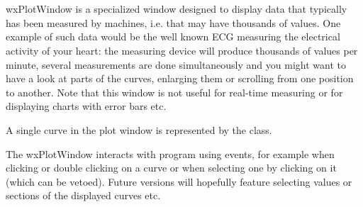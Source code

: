 %
%

\section{}\label{wxplotwindow}

wxPlotWindow is a specialized window designed to display data that typically has
been measured by machines, i.e. that may have thousands of values. One example of
such data would be the well known ECG measuring the electrical activity of your
heart: the measuring device will produce thousands of values per minute, several
measurements are done simultaneously and you might want to have a look at parts
of the curves, enlarging them or scrolling from one position to another. Note
that this window is not useful for real-time measuring or for displaying charts
with error bars etc.

A single curve in the plot window is represented by the  
class.

The wxPlotWindow interacts with program using events, for example when clicking
or double clicking on a curve or when selecting one by clicking on it (which
can be vetoed). Future versions will hopefully feature selecting values or
sections of the displayed curves etc.


\\
\\
\\
\\


\begin{twocollist}\itemsep=0pt
\end{twocollist}

